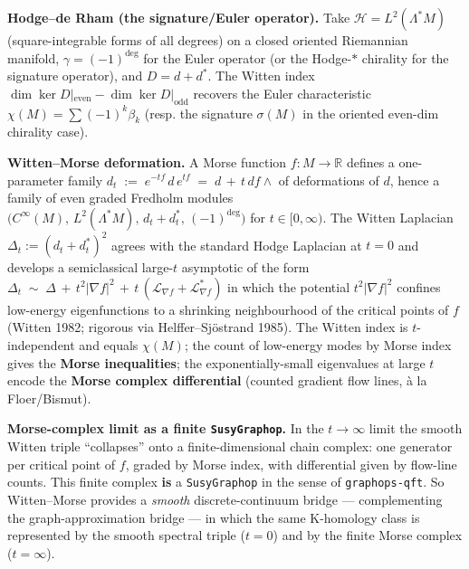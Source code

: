 \documentclass[
  11pt,
]{article}
\begin{document}
\textbf{Hodge--de Rham (the signature/Euler operator).} Take
\(\mathcal{H}= L^2(\Lambda^* M)\) (square-integrable forms of all
degrees) on a closed oriented Riemannian manifold,
\(\gamma = (-1)^{\deg}\) for the Euler operator (or the Hodge-\(*\)
chirality for the signature operator), and \(D = d + d^*\). The Witten
index \(\dim\ker D|_{\mathrm{even}} -
\dim\ker D|_{\mathrm{odd}}\) recovers the Euler characteristic
\(\chi(M) = \sum (-1)^k \beta_k\) (resp. the signature \(\sigma(M)\) in
the oriented even-dim chirality case).

\textbf{Witten--Morse deformation.} A Morse function
\(f \colon M \to \mathbb{R}\) defines a one-parameter family
\(d_t \;:=\; e^{-tf}\,d\,e^{tf} \;=\; d \,+\, t\,df \wedge\) of
deformations of \(d\), hence a family of even graded Fredholm modules
\(\bigl(C^\infty(M),\, L^2(\Lambda^*M),\, d_t + d_t^*,\, (-1)^{\deg}\bigr)\)
for \(t \in [0, \infty)\). The Witten Laplacian
\(\Delta_t := (d_t + d_t^*)^2\) agrees with the standard Hodge Laplacian
at \(t = 0\) and develops a semiclassical large-\(t\) asymptotic of the
form
\(\Delta_t \;\sim\; \Delta \,+\, t^2 |\nabla f|^2 \,+\, t\,(\mathcal{L}_{\nabla f} + \mathcal{L}_{\nabla f}^*)\)
in which the potential \(t^2 |\nabla f|^2\) confines low-energy
eigenfunctions to a shrinking neighbourhood of the critical points of
\(f\) (Witten 1982; rigorous via Helffer--Sjöstrand 1985). The Witten
index is \(t\)-independent and equals \(\chi(M)\); the count of
low-energy modes by Morse index gives the \textbf{Morse inequalities};
the exponentially-small eigenvalues at large \(t\) encode the
\textbf{Morse complex differential} (counted gradient flow lines, à la
Floer/Bismut).

\textbf{Morse-complex limit as a finite \texttt{SusyGraphop}.} In the
\(t \to \infty\) limit the smooth Witten triple ``collapses'' onto a
finite-dimensional chain complex: one generator per critical point of
\(f\), graded by Morse index, with differential given by flow-line
counts. This finite complex \textbf{is} a \texttt{SusyGraphop} in the
sense of \texttt{graphops-qft}. So Witten--Morse provides a
\emph{smooth} discrete-continuum bridge --- complementing the
graph-approximation bridge --- in which the same K-homology class is
represented by the smooth spectral triple (\(t = 0\)) and by the finite
Morse complex (\(t = \infty\)).
\end{document}
